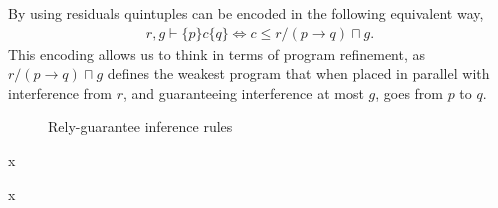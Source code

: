 \documentclass{llncs}
\begin{document}
By using residuals quintuples can be encoded in the following
equivalent way,
\begin{align}
r, g \vdash \{p\} c \{q\} \iff c \le r/(p \rightarrow q) \sqcap g \label{refine}.
\end{align}
This encoding allows us to think in terms of program
refinement, as $r/(p \rightarrow q) \sqcap g$ defines the weakest
program that when placed in parallel with interference from $r$, and
guaranteeing interference at most $g$, goes from $p$ to $q$.

\begin{figure}[tbh]
\centering
\begin{prooftree}
\end{prooftree}

\begin{prooftree}
\end{prooftree}

\begin{prooftree}
\end{prooftree}

\begin{prooftree}
\end{prooftree}

\begin{prooftree}
\end{prooftree}

\begin{prooftree}
\end{prooftree}
\caption{Rely-guarantee inference rules}
\label{fig:rgrules}
\end{figure}
x

x
\end{document}
